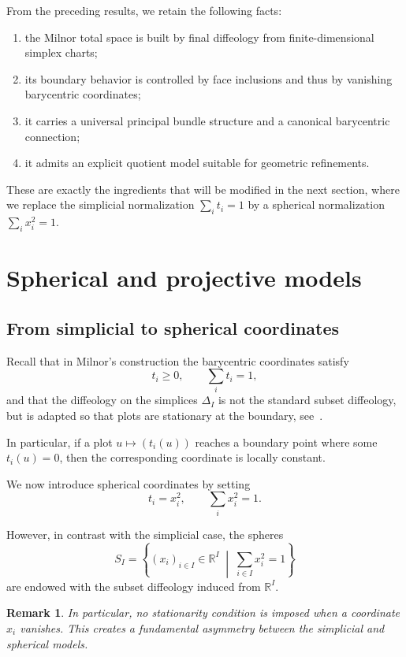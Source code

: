 \documentclass[11pt]{amsart}
\newtheorem{remark}[theorem]{Remark}
\begin{document}
From the preceding results, we retain the following facts:
\begin{enumerate}
\item the Milnor total space is built by final diffeology from finite-dimensional simplex charts;
\item its boundary behavior is controlled by face inclusions and thus by vanishing barycentric coordinates;
\item it carries a universal principal bundle structure and a canonical barycentric connection;
\item it admits an explicit quotient model suitable for geometric refinements.
\end{enumerate}

These are exactly the ingredients that will be modified in the next section, where we replace the simplicial normalization \(\sum_i t_i=1\) by a spherical normalization \(\sum_i x_i^2=1\).
\section{Spherical and projective models} \label{3}

\subsection{From simplicial to spherical coordinates}

Recall that in Milnor's construction the barycentric coordinates satisfy
\[
t_i \ge 0, \qquad \sum_i t_i = 1,
\]
and that the diffeology on the simplices $\Delta_I$ is not the standard subset diffeology, but is adapted so that plots are stationary at the boundary, see~\cite{MagnotWatts2017}.

In particular, if a plot $u \mapsto (t_i(u))$ reaches a boundary point where some $t_i(u)=0$, then the corresponding coordinate is locally constant.

\medskip

We now introduce spherical coordinates by setting
\[
t_i = x_i^2,
\qquad \sum_i x_i^2 = 1.
\]

However, in contrast with the simplicial case, the spheres
\[
S_I = \left\{ (x_i)_{i\in I} \in \mathbb{R}^I \;\middle|\; \sum_{i\in I} x_i^2 = 1 \right\}
\]
are endowed with the subset diffeology induced from $\mathbb{R}^I$.

\begin{remark}
In particular, no stationarity condition is imposed when a coordinate $x_i$ vanishes. This creates a fundamental asymmetry between the simplicial and spherical models.
\end{remark}
\end{document}
